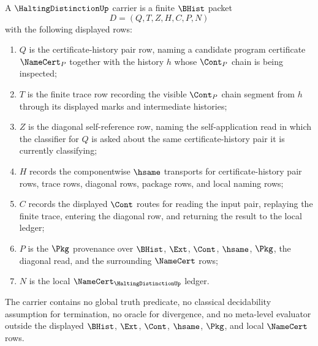 \begin{definition}
\label{def:halting-distinction-carrier}
A $\HaltingDistinctionUp$ carrier is a finite $\BHist$ packet
$$
D=(Q,T,Z,H,C,P,N)
$$
with the following displayed rows:
\begin{enumerate}
\item $Q$ is the certificate-history pair row, naming a candidate program certificate $\NameCert_P$ together with the history $h$ whose $\Cont_P$ chain is being inspected;
\item $T$ is the finite trace row recording the visible $\Cont_P$ chain segment from $h$ through its displayed marks and intermediate histories;
\item $Z$ is the diagonal self-reference row, naming the self-application read in which the classifier for $Q$ is asked about the same certificate-history pair it is currently classifying;
\item $H$ records the componentwise $\hsame$ transports for certificate-history pair rows, trace rows, diagonal rows, package rows, and local naming rows;
\item $C$ records the displayed $\Cont$ routes for reading the input pair, replaying the finite trace, entering the diagonal row, and returning the result to the local ledger;
\item $P$ is the $\Pkg$ provenance over $\BHist$, $\Ext$, $\Cont$, $\hsame$, $\Pkg$, the diagonal read, and the surrounding $\NameCert$ rows;
\item $N$ is the local $\NameCert_{\HaltingDistinctionUp}$ ledger.
\end{enumerate}
The carrier contains no global truth predicate, no classical decidability assumption for termination, no oracle for divergence, and no meta-level evaluator outside the displayed $\BHist$, $\Ext$, $\Cont$, $\hsame$, $\Pkg$, and local $\NameCert$ rows.
\end{definition}

